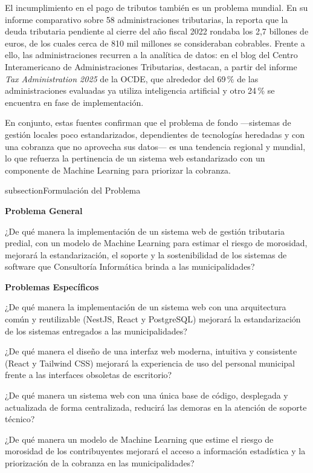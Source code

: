 \documentclass[12pt,a4paper]{report}
\newcommand{\subtitulo}[1]{\par\vspace{4pt}\noindent\textbf{#1}\par}
\begin{document}
El incumplimiento en el pago de tributos también es un problema mundial. En su informe comparativo sobre 58 administraciones tributarias, la \textcite{ocde2024} reporta que la deuda tributaria pendiente al cierre del año fiscal 2022 rondaba los 2,7 billones de euros, de los cuales cerca de 810 mil millones se consideraban cobrables. Frente a ello, las administraciones recurren a la analítica de datos: en el blog del Centro Interamericano de Administraciones Tributarias, \textcite{collosa2025} destacan, a partir del informe \textit{Tax Administration 2025} de la OCDE, que alrededor del 69\,\% de las administraciones evaluadas ya utiliza inteligencia artificial y otro 24\,\% se encuentra en fase de implementación.

En conjunto, estas fuentes confirman que el problema de fondo ---sistemas de gestión locales poco estandarizados, dependientes de tecnologías heredadas y con una cobranza que no aprovecha sus datos--- es una tendencia regional y mundial, lo que refuerza la pertinencia de un sistema web estandarizado con un componente de Machine Learning para priorizar la cobranza.

subsection{Formulación del Problema}

\subtitulo{Problema General}

¿De qué manera la implementación de un sistema web de gestión tributaria predial, con un modelo de Machine Learning para estimar el riesgo de morosidad, mejorará la estandarización, el soporte y la sostenibilidad de los sistemas de software que Consultoría Informática brinda a las municipalidades?

\subtitulo{Problemas Específicos}

¿De qué manera la implementación de un sistema web con una arquitectura común y reutilizable (NestJS, React y PostgreSQL) mejorará la estandarización de los sistemas entregados a las municipalidades?

¿De qué manera el diseño de una interfaz web moderna, intuitiva y consistente (React y Tailwind CSS) mejorará la experiencia de uso del personal municipal frente a las interfaces obsoletas de escritorio?

¿De qué manera un sistema web con una única base de código, desplegada y actualizada de forma centralizada, reducirá las demoras en la atención de soporte técnico?

¿De qué manera un modelo de Machine Learning que estime el riesgo de morosidad de los contribuyentes mejorará el acceso a información estadística y la priorización de la cobranza en las municipalidades?
\end{document}
